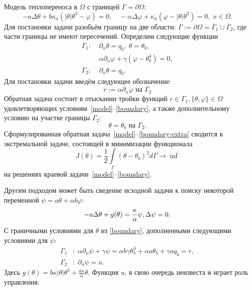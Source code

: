 Модель теплопереноса в $\Omega$ с границей $\Gamma = \partial \Omega$:
\begin{equation}
    \label{model}
    - a \Delta\theta + b\kappa_a(|\theta|\theta^3- \varphi)=0,   \quad
    - \alpha \Delta \varphi + \kappa_a(\varphi-|\theta|\theta^3)=0,\; x\in\Omega.
\end{equation}
Для постановки задачи разобьём границу на две области:
$\Gamma := \partial \Omega =\overline{\Gamma}_1 \cup \overline{\Gamma}_2$,
где части границы не имеют пересечений.
Определим следующие функции
\begin{equation}
    \label{boundary}
    \begin{aligned}
        \Gamma_1 :\; &\partial_n \theta = q_b,\; \theta = \theta_b, \\
        &\alpha\partial_n\varphi + \gamma (\varphi - \theta_b ^4 ) = 0, \\
        \Gamma_2 :\; & \partial_n \theta = q_b.
    \end{aligned}
\end{equation}
Для постановки задачи введём следующее обозначение:
\[
    r:= \alpha \partial_n \varphi \text{ на }\Gamma_2
\]
Обратная задача состоит в отыскании тройки функций $r \in  \Gamma_1, \{\theta, \varphi\} \in \Omega $
удовлетворяющих условиям~\eqref{model}--\eqref{boundary}, а также дополнительному условию
на участке границы $\Gamma_2$:
\begin{equation}
    \label{boundary-extra}
    \theta = \theta_b \text{ на } \Gamma_2.
\end{equation}
Сформулированная обратная задача~\eqref{model}--\eqref{boundary-extra} сводится к экстремальной задаче,
состоящей в минимизации функционала
\begin{equation}
    \label{cost}
    J(\theta) = \frac{1}{2}\int\limits_\Gamma (\theta - \theta_b)^{2} d\Gamma \rightarrow \inf
\end{equation}
на решениях краевой задачи~\eqref{model}--\eqref{boundary}.


Другим подходом может быть сведение исходной задачи к поиску некоторой
переменной $\psi = a\theta + \alpha b \varphi$:
\begin{equation}
    \label{eq:equation}
    -a \Delta \theta + g (\theta) = \frac{\kappa}{\alpha}\psi, \\
    \Delta \psi = 0.
\end{equation}
С граничными условиями для $\theta$ из \eqref{boundary}, дополненными следующими условиями для
$\psi$:
\begin{equation}
    \label{eq:boundary-2}
    \begin{aligned}
        \Gamma_1 &: \; \alpha \partial_n \psi + \gamma \psi = \alpha b \gamma \theta_b^4 + \alpha a \theta_b + \gamma a q_b = r, \\
        \Gamma_2 &: \; \partial_n \psi = u.
    \end{aligned}
\end{equation}
Здесь $g(\theta) = b \kappa|\theta|\theta^3 + \frac{a\kappa}{\alpha}\theta$.
Функция $u$, в свою очередь неизвеста и играет роль управления.